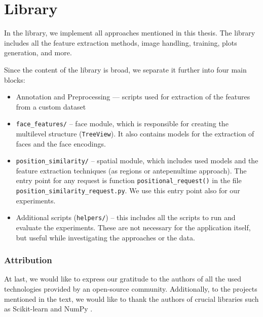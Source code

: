 \section{Library}

In the library, we implement all approaches mentioned in this thesis. The library includes all the feature extraction methods, image handling, training, plots generation, and more.

Since the content of the library is broad, we separate it further into four main blocks: 
\begin{itemize}
    \item Annotation and Preprocessing --- scripts used for extraction of the features from a custom dataset
    \item \verb+face_features/+ -- face module, which is responsible for creating the multilevel structure (\verb+TreeView+). It also contains models for the extraction of faces and the face encodings.
    \item \verb+position_similarity/+ -- spatial module, which includes used models and the feature extraction techniques (as regions or antepenultime approach). The entry point for any request is function \verb+positional_request()+ in the file \verb+position_similarity_request.py+. We use this entry point also for our experiments.
    \item Additional scripts (\verb+helpers/+) -- this includes all the scripts to run and evaluate the experiments. These are not necessary for the application itself, but useful while investigating the approaches or the data.
\end{itemize}

\subsubsection*{Attribution}

At last, we would like to express our gratitude to the authors of all the used technologies provided by an open-source community. Additionally, to the projects mentioned in the text, we would like to thank the authors of crucial libraries such as Scikit-learn \citep{pedregosa2011scikit} and NumPy \citep{van2011numpy}.

